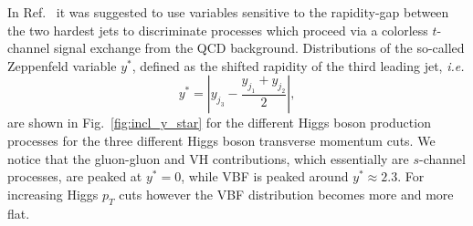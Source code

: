 \documentclass[10pt,prd,fleqn,superscriptaddress,notitlepage,nofootinbib,preprintnumbers,nobalancelastpage]{revtex4-1}
\newcommand{\VBF}{VBF\xspace}
\newcommand{\VH}{VH\xspace}
\begin{document}
In Ref.~\cite{Rainwater:1996ud} it was suggested to use variables sensitive to the rapidity-gap between the two hardest jets to discriminate processes which proceed via a colorless $t$-channel signal exchange from the QCD background.
Distributions of the so-called Zeppenfeld variable $y^*$, defined as the shifted rapidity of the third leading jet, \emph{i.e.}
\begin{equation}
    y^* = \left| y_{j_3}- \frac{y_{j_1}+y_{j_2}}{2}\right|,
\end{equation}
are shown in Fig.~\ref{fig:incl_y_star} for the different Higgs boson production processes for the three different Higgs boson transverse momentum cuts.
We notice that the gluon-gluon and \VH{} contributions, which essentially are $s$-channel processes, are peaked at $y^*=0$, while \VBF is peaked around $y^*\approx 2.3$. For increasing Higgs $p_T$ cuts however the \VBF{} distribution becomes more and more flat.
\end{document}
